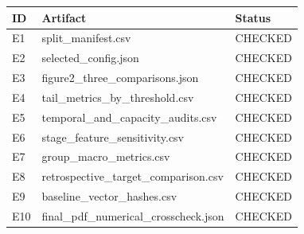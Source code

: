 \begin{tabular}{lll}
\toprule
ID & Artifact & Status \\
\midrule
E1 & split\_manifest.csv & CHECKED \\
E2 & selected\_config.json & CHECKED \\
E3 & figure2\_three\_comparisons.json & CHECKED \\
E4 & tail\_metrics\_by\_threshold.csv & CHECKED \\
E5 & temporal\_and\_capacity\_audits.csv & CHECKED \\
E6 & stage\_feature\_sensitivity.csv & CHECKED \\
E7 & group\_macro\_metrics.csv & CHECKED \\
E8 & retrospective\_target\_comparison.csv & CHECKED \\
E9 & baseline\_vector\_hashes.csv & CHECKED \\
E10 & final\_pdf\_numerical\_crosscheck.json & CHECKED \\
\bottomrule
\end{tabular}
